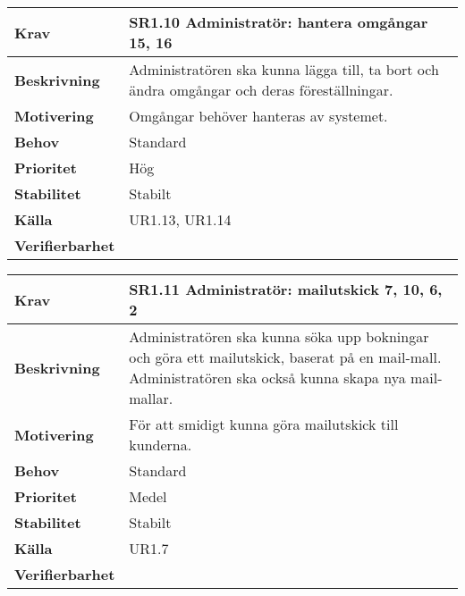 \documentclass[a4paper, twoside, 11pt, titlepage]{article}
\begin{document}
	\begin{tabular} { p{2.6cm} p{12.5cm} }
		\hline
		\sffamily\textbf{Krav} & \sffamily\textbf{SR1.10 Administratör: hantera omgångar 15, 16 } \\
		\hline
		\sffamily\textbf{Beskrivning} & Administratören ska kunna lägga till, ta bort och ändra omgångar och deras föreställningar.  \\
		\hline
		\sffamily\textbf{Motivering} & Omgångar behöver hanteras av systemet.  \\
		\hline
		\sffamily\textbf{Behov} & Standard  \\
		\hline
		\sffamily\textbf{Prioritet} & Hög  \\
		\hline
		\sffamily\textbf{Stabilitet} & Stabilt  \\
		\hline
		\sffamily\textbf{Källa} & UR1.13, UR1.14  \\
		\hline
		\sffamily\textbf{Verifierbarhet} &   \\
		\hline
	\end{tabular}
	\vspace{6mm}

	\begin{tabular} { p{2.6cm} p{12.5cm} }
		\hline
		\sffamily\textbf{Krav} & \sffamily\textbf{SR1.11 Administratör: mailutskick 7, 10, 6, 2 } \\
		\hline
		\sffamily\textbf{Beskrivning} & Administratören ska kunna söka upp bokningar och göra ett mailutskick, baserat på en mail-mall. Administratören ska också kunna skapa nya mail-mallar.  \\
		\hline
		\sffamily\textbf{Motivering} & För att smidigt kunna göra mailutskick till kunderna.  \\
		\hline
		\sffamily\textbf{Behov} & Standard  \\
		\hline
		\sffamily\textbf{Prioritet} & Medel  \\
		\hline
		\sffamily\textbf{Stabilitet} & Stabilt  \\
		\hline
		\sffamily\textbf{Källa} & UR1.7  \\
		\hline
		\sffamily\textbf{Verifierbarhet} &   \\
		\hline
	\end{tabular}
	\vspace{6mm}
\end{document}
